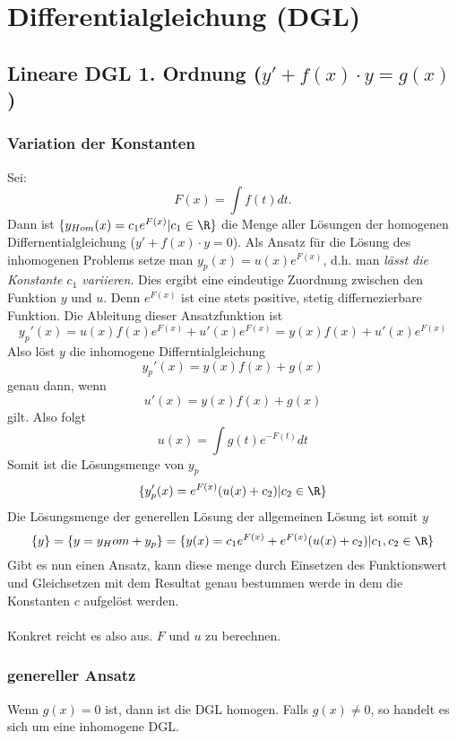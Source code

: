 \section{Differentialgleichung (DGL)}
\subsection{Lineare DGL 1. Ordnung ($y' + f(x) \cdot y = g(x)$)}
\subsubsection{Variation der Konstanten}
Sei:\[
F(x) = \int f(t) dt.
\]
Dann ist $\{y_{Hom}(x) = c_1e^{F(x)}| c_1 \in \R\}$ die Menge aller Lösungen der homogenen Differnentialgleichung ($y' + f(x) \cdot y = 0$). Als Ansatz für die Lösung des inhomogenen Problems setze man $y_p(x) = u(x)e^{F(x)}$, d.h. man \textit{lässt die Konstante $c_1$ variieren}. Dies ergibt eine eindeutige Zuordnung zwischen den Funktion $y$ und $u$. Denn $e^{F(x)}$ ist eine stets positive, stetig differnezierbare Funktion. Die Ableitung dieser Ansatzfunktion ist \[
y_p'(x) = u(x)f(x)e^{F(x)} + u'(x)e^{F(x)} = y(x)f(x) + u'(x)e^{F(x)}
\]
Also löst $y$ die inhomogene Differntialgleichung \[
y_p'(x) = y(x)f(x) + g(x)
\]
genau dann, wenn\[
u'(x) = y(x)f(x) + g(x)
\]
gilt. Also folgt\[
u(x) = \int  g(t)e^{-F(t)} dt
\]
Somit ist die Lösungsmenge von $y_p$
\[
\{ y_p'(x) = e^{F(x)} (u(x) + c_2) | c_2 \in \R \}
\]
Die Lösungsmenge der generellen Lösung der allgemeinen Lösung ist somit $y$\[
\{y\}=\{y = y_Hom + y_p\} = \{ y(x) =  c_1e^{F(x)} +  e^{F(x)} (u(x) + c_2) | c_1, c_2 \in \R \}
\]
Gibt es nun einen Ansatz, kann diese menge durch Einsetzen des Funktionswert und Gleichsetzen mit dem Resultat genau bestummen werde in dem die Konstanten $c$  aufgelöst werden.\\
\\
Konkret reicht es also aus. $F$ und $u$ zu berechnen. 

\subsubsection{genereller Ansatz}
Wenn $g(x) = 0$ ist, dann ist die DGL homogen. Falls $g(x) \neq 0$, so handelt
es sich um eine inhomogene DGL.

